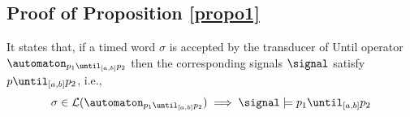 


\subsection{Proof of Proposition \ref{propo1}}
It states that, if a timed word $\sigma$ is accepted by the transducer of Until operator $\automaton_{p_1\until_{[a,b]}p_2}$ then the corresponding signals $\signal$ satisfy $ p\until_{[a,b]}p_2$, i.e.,
        \begin{align*}
            \sigma \in \mathcal{L}(\automaton_{p_1\until_{[a,b]}p_2}) \implies \signal \models p_1\until_{[a,b]}p_2
        \end{align*}

